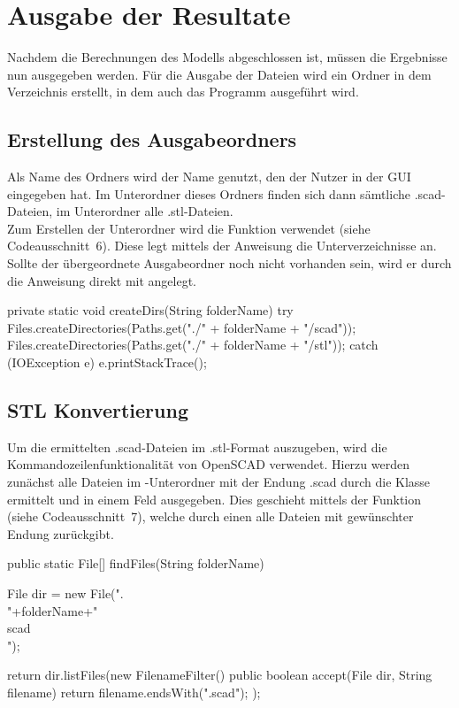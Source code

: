\section{Ausgabe der Resultate}
Nachdem die Berechnungen des Modells abgeschlossen ist, müssen die Ergebnisse nun ausgegeben werden.
Für die Ausgabe der Dateien wird ein Ordner in dem Verzeichnis erstellt, in dem auch das Programm ausgeführt wird.

\subsection{Erstellung des Ausgabeordners}
Als Name des Ordners wird der Name genutzt, den der Nutzer in der GUI eingegeben hat.
Im Unterordner  dieses Ordners finden sich dann sämtliche .scad-Dateien, im Unterordner  alle .stl-Dateien. \\
Zum Erstellen der Unterordner wird die Funktion  verwendet (siehe Codeausschnitt~6).
Diese legt mittels der Anweisung  die Unterverzeichnisse an.
Sollte der übergeordnete Ausgabeordner noch nicht vorhanden sein, wird er durch die Anweisung direkt mit angelegt. \\
 
\begin{code}
	private static void createDirs(String folderName) {
		try {
			Files.createDirectories(Paths.get("./" + folderName + "/scad"));
			Files.createDirectories(Paths.get("./" + folderName + "/stl"));
		} catch (IOException e) {
			e.printStackTrace();
		}
	}
\end{code}

\subsection{STL Konvertierung}
Um die ermittelten .scad-Dateien im .stl-Format auszugeben, wird die Kommandozeilenfunktionalität von OpenSCAD verwendet.
Hierzu werden zunächst alle Dateien im -Unterordner mit der Endung .scad durch die Klasse  ermittelt und in einem Feld ausgegeben.
Dies geschieht mittels der Funktion  (siehe Codeausschnitt~7), welche durch einen  alle Dateien mit gewünschter Endung zurückgibt. \\

\begin{code}
	public static File[] findFiles(String folderName){
		File dir = new File(".\\"+folderName+"\\scad\\");
		
		return dir.listFiles(new FilenameFilter() { 
			public boolean accept(File dir, String filename)
			{ return filename.endsWith(".scad"); }
		});
	}
\end{code}

